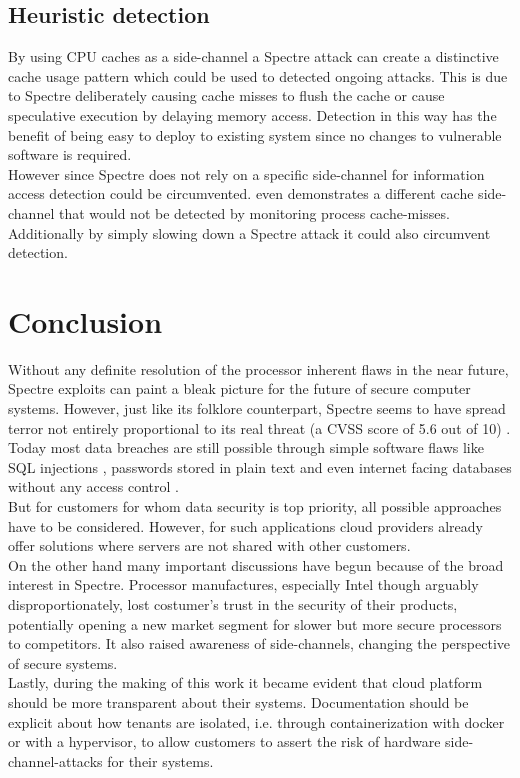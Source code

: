 \documentclass[conference,compsoc,final,a4paper]{IEEEtran}
\begin{document}
\subsection{Heuristic detection}
By using CPU caches as a side-channel a Spectre attack can create a distinctive cache usage pattern which could be used to detected ongoing attacks. \cite{depoix2018}
This is due to Spectre deliberately causing cache misses to flush the cache or cause speculative execution by delaying memory access. Detection in this way has the
benefit of being easy to deploy to existing system since no changes to vulnerable software is required. \cite{depoix2018, chiappetta2016real} \\
However since Spectre does not rely on a specific side-channel for information access \cite{kocher2018spectre} detection could be circumvented. \textcite{gruss2016flush+}
even demonstrates a different cache side-channel that would not be detected by monitoring process cache-misses. \\
Additionally by simply slowing down a Spectre attack it could also circumvent detection. \cite{chiappetta2016real}
\section{Conclusion}
Without any definite resolution of the processor inherent flaws in the near future, Spectre exploits can paint a bleak picture for the future of secure computer systems. However, just like its folklore counterpart, Spectre seems to have spread terror not entirely proportional to its real threat (a \ac{CVSS} score of 5.6 out of 10) \cite{cveSpectre}. \\
Today most data breaches are still possible through simple software flaws like SQL injections \cite{magnetoSQLi}, passwords stored in plain text \cite{facebookPlainText} and even internet facing databases without any access control \cite{unistellarMongoDB}. \\
But for customers for whom data security is top priority, all possible approaches have to be considered. However, for such applications cloud providers already offer solutions where servers are not shared with other customers. \cite{AWSDedicated} \\
On the other hand many important discussions have begun because of the broad interest in Spectre. Processor manufactures, especially Intel though arguably disproportionately, lost costumer's trust in the security of their products, potentially opening a new market segment for slower but more secure processors to competitors. It also raised awareness of side-channels, changing the perspective of secure systems. \\
Lastly, during the making of this work it became evident that cloud platform should be more transparent about their systems. Documentation should be explicit about how tenants are isolated, i.e. through containerization with docker or with a hypervisor, to allow customers to assert the risk of hardware side-channel-attacks for their systems.
\end{document}
